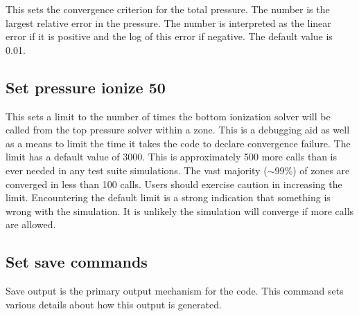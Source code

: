 This sets the convergence criterion for the total pressure.
The number
is the largest relative error in the pressure.
The number is interpreted
as the linear error if it is positive and the log of this error if negative.
The default value is 0.01.

\subsection{Set pressure ionize 50}

This sets a limit to the number of times the bottom ionization solver
will be called from the top pressure solver within a zone.
This is a debugging aid as well as a means to limit the time it
takes the code to declare convergence failure.
The limit has a default value of 3000.
This is approximately 500 more calls than is ever needed in any test suite simulations.
The vast majority ($\sim99\%$) of zones are converged in less than 100 calls.
Users should exercise caution in increasing the limit.
Encountering the default limit is a strong indication that something
is wrong with the simulation.
It is unlikely the simulation will converge if more calls are allowed.

\subsection{Set save commands}

Save output is the primary output mechanism for the code.
This command sets various details about
how this output is generated.

